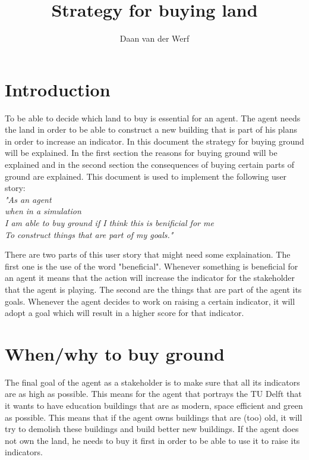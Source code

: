 \documentclass{article}
\author{Daan van der Werf}
\title{Strategy for buying land}
\begin{document}

\maketitle{}
\newpage{}

\section{Introduction}
To be able to decide which land to buy is essential for an agent. The agent needs the land in order to be able to construct a new building that is part of his plans in order to increase an indicator. In this document the strategy for buying ground will be explained. In the first section the reasons for buying ground will be explained and in the second section the consequences of buying certain parts of ground are explained. This document is used to implement the following user story:\\

\noindent\textit{"As an agent\\
when in a simulation\\
I am able to buy ground if I think
this is benificial for me\\
To construct 
things that are part of my goals."\\}

There are two parts of this user story that might need some explaination. The first one is the use of the word "beneficial". Whenever something is beneficial for an agent it means that the action will increase the indicator for the stakeholder that the agent is playing. The second are the things that are part of the agent its goals. Whenever the agent decides to work on raising a certain indicator, it will adopt a goal which will result in a higher score for that indicator.

\section{When/why to buy ground}
The final goal of the agent as a stakeholder is to make sure that all its indicators are as high as possible. This means for the agent that portrays the TU Delft that it wants to have education buildings that are as modern, space efficient and green as possible. This means that if the agent owns buildings that are (too) old, it will try to demolish these buildings and build better new buildings. If the agent does not own the land, he needs to buy it first in order to be able to use it to raise its indicators. 
\end{document}
